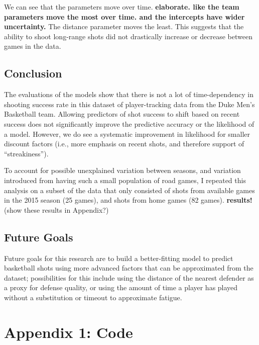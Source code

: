 \documentclass[12pt,twoside]{dukestatscithesis}
\theoremstyle{definition}
\theoremstyle{definition}
\theoremstyle{definition}
\theoremstyle{remark}
\begin{document}
We can see that the parameters move over time. \textbf{elaborate. like
the team parameters move the most over time. and the intercepts have
wider uncertainty.} The distance parameter moves the least. This
suggests that the ability to shoot long-range shots did not drastically
increase or decrease between games in the data.

\section{Conclusion}\label{conclusion}

The evaluations of the models show that there is not a lot of
time-dependency in shooting success rate in this dataset of
player-tracking data from the Duke Men's Basketball team. Allowing
predictors of shot success to shift based on recent success does not
significantly improve the predictive accuracy or the likelihood of a
model. However, we do see a systematic improvement in likelihood for
smaller discount factors (i.e., more emphasis on recent shots, and
therefore support of ``streakiness'').

To account for possible unexplained variation between seasons, and
variation introduced from having such a small population of road games,
I repeated this analysis on a subset of the data that only consisted of
shots from available games in the 2015 season (25 games), and shots from
home games (82 games). \textbf{results!} (show these results in
Appendix?)

\section{Future Goals}\label{future-goals}

Future goals for this research are to build a better-fitting model to
predict basketball shots using more advanced factors that can be
approximated from the dataset; possibilities for this include using the
distance of the nearest defender as a proxy for defense quality, or
using the amount of time a player has played without a substitution or
timeout to approximate fatigue.

\appendix

\chapter{Appendix 1: Code}\label{appendix-1-code}
\end{document}

